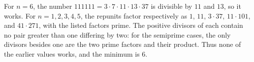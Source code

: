 For $n=6$, the number $111111=3\cdot7\cdot11\cdot13\cdot37$ is divisible by $11$ and $13$, so it works. For $n=1,2,3,4,5$, the repunits factor respectively as $1$, $11$, $3\cdot37$, $11\cdot101$, and $41\cdot271$, with the listed factors prime. The positive divisors of each contain no pair greater than one differing by two: for the semiprime cases, the only divisors besides one are the two prime factors and their product. Thus none of the earlier values works, and the minimum is $\boxed6$.
